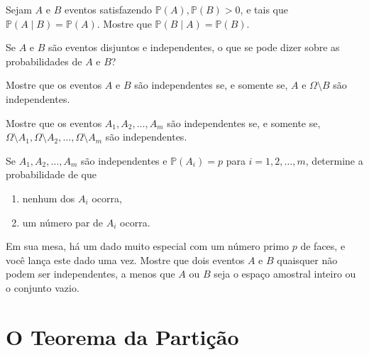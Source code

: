 \begin{exercise}\label{gw:exercicio:indep-simetrica}
  Sejam \(A\) e \(B\) eventos satisfazendo \(\mathbb{P}(A), \mathbb{P}(B) >
  0\), e tais que \(\mathbb{P}(A \mid B) = \mathbb{P}(A)\). Mostre que
  \(\mathbb{P}(B \mid A) = \mathbb{P}(B)\).
\end{exercise}

\begin{exercise}\label{gw:exercicio:disjuntos-indep}
  Se \(A\) e \(B\) são eventos disjuntos e independentes, o que se pode dizer
  sobre as probabilidades de \(A\) e \(B\)?
\end{exercise}

\begin{exercise}\label{gw:exercicio:indep-complementar}
  Mostre que os eventos \(A\) e \(B\) são independentes se, e somente se, \(A\)
  e \(\Omega \setminus B\) são independentes.
\end{exercise}

\begin{exercise}\label{gw:exercicio:indep-complementares}
  Mostre que os eventos \(A_1, A_2, \ldots, A_m\) são independentes se, e
  somente se, \(\Omega \setminus A_1, \Omega \setminus A_2, \ldots, \Omega
  \setminus A_m\) são independentes.
\end{exercise}

\begin{exercise}\label{gw:exercicio:p-eventos}
  Se \(A_1, A_2, \ldots, A_m\) são independentes e \(\mathbb{P}(A_i) = p\)
  para \(i = 1, 2, \ldots, m\), determine a probabilidade de que
  \begin{enumerate}[label=(\alph*)]
    \item nenhum dos \(A_i\) ocorra,
    \item um número par de \(A_i\) ocorra.
  \end{enumerate}
\end{exercise}

\begin{exercise}\label{gw:exercicio:dado-primo}
  Em sua mesa, há um dado muito especial com um número primo \(p\) de faces, e
  você lança este dado uma vez. Mostre que dois eventos \(A\) e \(B\) quaisquer
  não podem ser independentes, a menos que \(A\) ou \(B\) seja o espaço
  amostral inteiro ou o conjunto vazio.
\end{exercise}

\section{O Teorema da Partição}


